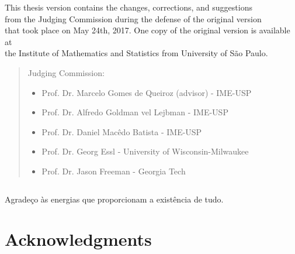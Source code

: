 \documentclass[11pt,twoside,a4paper]{book}
\begin{document}
	    \begin{flushright} 
	    This thesis version contains the changes, corrections, and suggestions\\%
		from the Judging Commission during the defense of the original version\\%
		that took place on May 24th, 2017. One copy of the original version is available at\\ %
		the Institute of Mathematics and Statistics from University of São Paulo.%
		
	
	    \vskip 2cm
	
	    \end{flushright}
	    \vskip 4.2cm
	
	    \begin{quote}
	    \noindent Judging Commission:
	    
	    \begin{itemize}
			\item Prof. Dr. Marcelo Gomes de Queiroz (advisor) - IME-USP
			\item Prof. Dr. Alfredo Goldman vel Lejbman - IME-USP
			\item Prof. Dr. Daniel Macêdo Batista - IME-USP
			\item Prof. Dr. Georg Essl - University of Wisconsin-Milwaukee
			\item Prof. Dr. Jason Freeman - Georgia Tech
	    \end{itemize}
	      
	    \end{quote}
	\pagebreak
	
	\newpage
	\thispagestyle{empty}
	$ $
	\vskip 19cm
	\begin{flushright}
		Agradeço às energias que proporcionam a existência de tudo.
	\end{flushright}
	\pagebreak
	
	
	

	 \chapter*{Acknowledgments}
	
\end{document}
